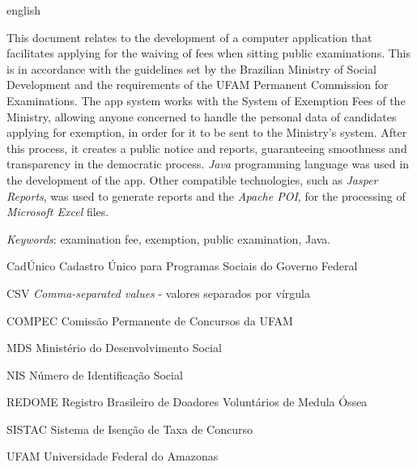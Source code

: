 \documentclass[
	12pt,			%
	openright,		%
	oneside,	
	a4paper,		%
	english,		%
	brazil			%
]{abntex2/abntex2}  %
\begin{document}
	\begin{abstracteng}[Abstract]
		\begin{otherlanguage*}{english}
		
			This document relates to the development of a computer application that facilitates applying for the waiving of fees when sitting public examinations. This is in accordance with the guidelines set by the Brazilian Ministry of Social Development and the requirements of the UFAM Permanent Commission for Examinations. The app system works with the System of Exemption Fees of the Ministry, allowing anyone concerned to handle the personal data of candidates applying for exemption, in order for it to be sent to the Ministry's system. After this process, it creates a public notice and reports, guaranteeing smoothness and transparency in the democratic process. \textit{Java} programming language was used in the development of the app. Other compatible technologies, such as \textit{Jasper Reports}, was used to generate reports and the \textit{Apache POI}, for the processing of \textit{Microsoft Excel} files.

			\vspace{\onelineskip}
			\noindent
			\textit{Keywords}: examination fee, exemption, public examination, Java.
	
		\end{otherlanguage*}
	\end{abstracteng}

	\listoffigures*
	\cleardoublepage

	\listoftables*
	\cleardoublepage


	\begin{siglas}

		\item[CadÚnico] Cadastro Único para Programas Sociais do Governo Federal
		\item[CSV] \textit{Comma-separated values} - valores separados por vírgula
		\item[COMPEC] Comissão Permanente de Concursos da UFAM
		\item[MDS] Ministério do Desenvolvimento Social
		\item[NIS] Número de Identificação Social
		\item[REDOME] Registro Brasileiro de Doadores Voluntários de Medula Óssea
		\item[SISTAC] Sistema de Isenção de Taxa de Concurso
		\item[UFAM] Universidade Federal do Amazonas

	\end{siglas}
\end{document}
